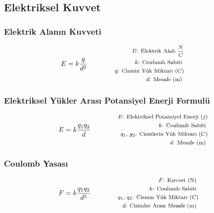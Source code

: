 \subsection{Elektriksel Kuvvet}

\subsubsection*{Elektrik Alanın Kuvveti}
\begin{equation}
    E = k\frac{q}{d^2} \qquad \qquad \parbox{4cm}{\footnotesize$\begin{aligned}
        E\text{: Elektrik Alab } \frac{N}{C} \\
        k\text{: Coulumb Sabiti } \\
        q\text{: Cismin Yük Miktarı } (C) \\
        d\text{: Mesafe (m) }
\end{aligned}$}
\end{equation}

\subsubsection*{Elektriksel Yükler Arası Potansiyel Enerji Formulü}
\begin{equation}
    E = k \frac{q_1 q_2}{d} \qquad \qquad \parbox{4cm}{\footnotesize$\begin{aligned}
        E\text{: Elektriksel Potansiyel Enerji } (j) \\
        k\text{: Coulumb Sabiti } \\
        q_1\text{, }g_2\text{: Cismlerin Yük Miktarı } (C) \\
        d\text{: Mesafe (m) }
\end{aligned}$}
\end{equation}

\subsubsection*{Coulomb Yasası}
\begin{equation}
    F = k\frac{q_1 q_2}{d^2} \qquad \qquad \parbox{4cm}{\footnotesize$\begin{aligned}
        F\text{: Kuvvet (N) } \\
        k\text{: Coulumb Sabiti } \\
        q_1\text{, }q_2\text{: Cismin Yük Miktarı } (C) \\
        d\text{: Cisimler Arası Mesafe (m) }
\end{aligned}$}
\end{equation}

